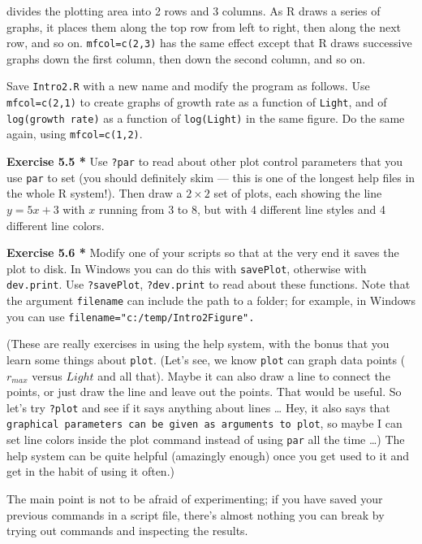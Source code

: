 \documentclass[11pt,]{article}
\begin{document}
divides the plotting area into 2 rows and 3 columns. As R draws a series
of graphs, it places them along the top row from left to right, then
along the next row, and so on. \texttt{mfcol=c(2,3)} has the same effect
except that R draws successive graphs down the first column, then down
the second column, and so on.

Save \texttt{Intro2.R} with a new name and modify the program as
follows. Use \texttt{mfcol=c(2,1)} to create graphs of growth rate as a
function of \texttt{Light}, and of \texttt{log(growth\ rate)} as a
function of \texttt{log(Light)} in the same figure. Do the same again,
using \texttt{mfcol=c(1,2)}.

\textbf{Exercise 5.5 * } Use \texttt{?par} to read about other plot
control parameters that you use \texttt{par} to set (you should
definitely skim --- this is one of the longest help files in the whole R
system!). Then draw a \(2 \times 2\) set of plots, each showing the line
\(y=5x+3\) with \(x\) running from 3 to 8, but with 4 different line
styles and 4 different line colors.

\textbf{Exercise 5.6 * } Modify one of your scripts so that at the very
end it saves the plot to disk. In Windows you can do this with
\texttt{savePlot}, otherwise with \texttt{dev.print}. Use
\texttt{?savePlot}, \texttt{?dev.print} to read about these functions.
Note that the argument \texttt{filename} can include the path to a
folder; for example, in Windows you can use
\texttt{filename="c:/temp/Intro2Figure".}

(These are really exercises in using the help system, with the bonus
that you learn some things about \texttt{plot}. (Let's see, we know
\texttt{plot} can graph data points (\(r_{max}\) versus \(Light\) and
all that). Maybe it can also draw a line to connect the points, or just
draw the line and leave out the points. That would be useful. So let's
try \texttt{?plot} and see if it says anything about lines \ldots{} Hey,
it also says that
\texttt{graphical\ parameters\ can\ be\ given\ as\ arguments\ to\ plot},
so maybe I can set line colors inside the plot command instead of using
\texttt{par} all the time \ldots{}) The help system can be quite helpful
(amazingly enough) once you get used to it and get in the habit of using
it often.)

The main point is not to be afraid of experimenting; if you have saved
your previous commands in a script file, there's almost nothing you can
break by trying out commands and inspecting the results.
\end{document}
